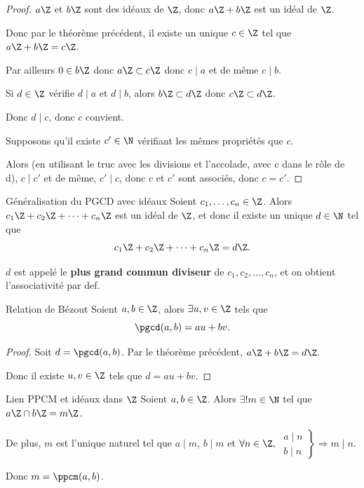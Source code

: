 \begin{proof}
    $a \Z$ et $b \Z$ sont des idéaux de $\Z$, donc $a \Z + b \Z$ est un idéal de $\Z$.

    Donc par le théorème précédent, il existe un unique $c \in \Z$ tel que $a \Z + b \Z = c \Z$.

    Par ailleurs $0 \in b \Z$ donc $a \Z \subset c \Z$ donc $c \mid a $ et de même $c \mid b$.

    Si $d \in \Z$ vérifie $d \mid a$ et $d \mid b$, alors $b \Z \subset d \Z$ donc $c \Z \subset d \Z$. 

    Donc $d \mid c$, donc $c $ convient. 

    \svspace Supposons qu'il existe $c' \in \N$ vérifiant les mêmes propriétés que $c$. 

    Alors (en utilisant le truc avec les divisions et l'accolade, avec c dans le rôle de d), 
    $c \mid c'$ et de même, $c' \mid c$, donc $c$ et $c'$ sont associés, donc $c = c'$.
\end{proof}


\begin{proposition}{Généralisation du PGCD avec idéaux}{}
    Soient $c_1, \ldots, c_n \in \Z$. Alors $c_1 \Z + c_2 \Z + \cdots + c_n \Z$ est un 
    idéal de $\Z$, et donc il existe un unique $d \in \N$ tel que 
    \[
        c_1 \Z + c_2 \Z + \cdots + c_n \Z = d \Z.
    \]

    $d$ est appelé le \textbf{plus grand commun diviseur} de $c_1, c_2, \ldots, c_n$, et 
    on obtient l'associativité par def. 
\end{proposition}

\begin{proposition}{Relation de Bézout}{}
    Soient $a, b \in \Z$, alors $\exists u, v \in \Z$ tels que 
    \[
        \pgcd(a, b) = au + bv.
    \]
\end{proposition}

\begin{proof}
    Soit $d = \pgcd(a, b)$. Par le théorème précédent, $a \Z + b \Z = d \Z$.

    Donc il existe $u, v \in \Z$ tels que $d = au + bv$.
\end{proof}

\begin{theoreme}{Lien PPCM et idéaux dans $\Z$}{}
    Soient $a, b \in \Z$. Alors $\exists ! m \in \N$ tel que $a \Z \cap b \Z = m \Z$.

    De plus, $m$ est l'unique naturel tel que $a \mid m$, $b \mid m$ et 
    $\forall n \in \Z,$
    $\left. \begin{aligned}
        a \mid n \\
        b \mid n    
    \end{aligned} \right\} \Rightarrow m \mid n$.

    Donc $m = \ppcm(a, b)$.
\end{theoreme}

